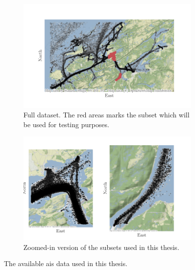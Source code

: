 \begin{figure}
    \centering
    \begin{subfigure}{\textwidth}
        \centering
        \includegraphics{figures/ais_map.pdf}
        \caption{Full dataset. The red areas marks the subset which will be used for testing purposes.}
    \end{subfigure}
    \begin{subfigure}{\textwidth}
        \centering
        \includegraphics{figures/ais_map_zoom.pdf}
        \caption{Zoomed-in version of the subsets used in this thesis.}
    \end{subfigure}
    \caption{The available \acrshort{ais} data used in this thesis. }
    \label{fig:ais_data}
\end{figure}


